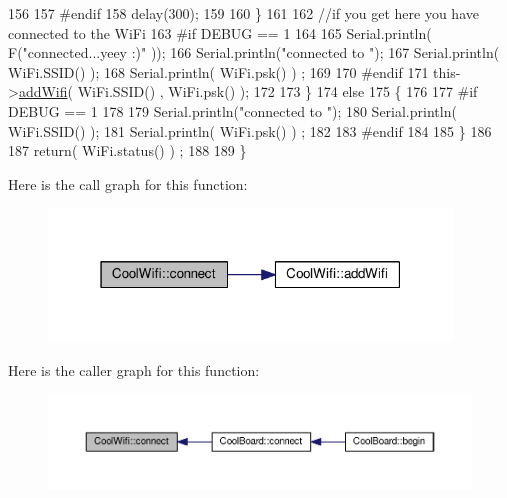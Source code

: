 \begin{DoxyCode}
156         
157 \textcolor{preprocessor}{        #endif}
158             delay(300);
159 
160         \} 
161 
162           \textcolor{comment}{//if you get here you have connected to the WiFi}
163 \textcolor{preprocessor}{        #if DEBUG == 1}
164 
165             Serial.println( F(\textcolor{stringliteral}{"connected...yeey :)"} ));
166             Serial.println(\textcolor{stringliteral}{"connected to "});
167             Serial.println( WiFi.SSID() );
168             Serial.println( WiFi.psk() ) ;
169             
170 \textcolor{preprocessor}{        #endif}
171             this->\hyperlink{classCoolWifi_a914d7a1df14dd6b75345fb614c34e9d6}{addWifi}( WiFi.SSID() , WiFi.psk() );
172         
173     \}
174     \textcolor{keywordflow}{else}
175     \{
176 
177 \textcolor{preprocessor}{    #if DEBUG == 1}
178 
179         Serial.println(\textcolor{stringliteral}{"connected to "});
180         Serial.println( WiFi.SSID() );
181         Serial.println( WiFi.psk() ) ;
182                 
183 \textcolor{preprocessor}{    #endif}
184     
185     \}
186     
187     \textcolor{keywordflow}{return}( WiFi.status() ) ;
188 
189 \}
\end{DoxyCode}
Here is the call graph for this function\+:\nopagebreak
\begin{figure}[H]
\begin{center}
\leavevmode
\includegraphics[width=304pt]{classCoolWifi_ad060353050f40d032a2dbf9e54a768bf_cgraph}
\end{center}
\end{figure}
Here is the caller graph for this function\+:\nopagebreak
\begin{figure}[H]
\begin{center}
\leavevmode
\includegraphics[width=350pt]{classCoolWifi_ad060353050f40d032a2dbf9e54a768bf_icgraph}
\end{center}
\end{figure}
\mbox{\label{classCoolWifi_a9e6105c6d13d35ec510f6633da9e0223}} 
